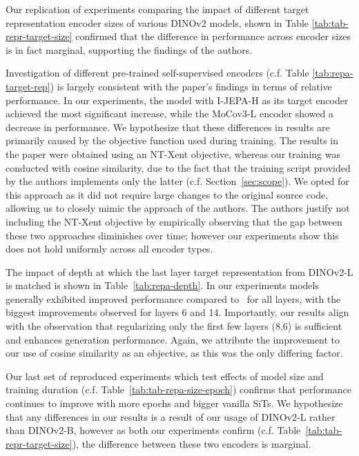 \documentclass{article}
\begin{document}
Our replication of experiments comparing the impact of different target representation encoder sizes of various DINOv2 models, shown in Table \ref{tab:tab-repr-target-size} confirmed that the difference in performance across encoder sizes is in fact marginal, supporting the findings of the authors. 

Investigation of different pre-trained self-supervised encoders (c.f. Table \ref{tab:repa-target-rep}) is largely consistent with the paper's findings in terms of relative performance. In our experiments, the model with  I-JEPA-H as its target encoder achieved the most significant increase, while the MoCov3-L encoder showed a decrease in performance. We hypothesize that these differences in results are primarily caused by the objective function used during training. The results in the paper were obtained using an NT-Xent objective, whereas our training was conducted with cosine similarity, due to the fact that the training script provided by the authors implements only the latter (c.f. Section~\ref{sec:scope}). We opted for this approach as it did not require large changes to the original source code, allowing us to closely mimic the approach of the authors. The authors justify not including the NT-Xent objective by  empirically observing that the gap between these two approaches diminishes over time; however our experiments show this does not hold uniformly across all encoder types.

The impact of depth at which the last layer target representation from DINOv2-L is matched is shown in Table~\ref{tab:repa-depth}. In our experiments models generally exhibited improved  performance compared to~\cite{yu2025repa} for all layers, with the biggest improvements observed for layers 6 and 14. Importantly, our results align with the observation that regularizing only the first few layers (8,6) is sufficient and enhances generation performance. Again, we attribute the improvement to our use of cosine similarity as an objective, as this was the only differing factor.

Our last set of reproduced experiments which test effects of model size and training duration (c.f. Table~\ref{tab:tab-repa-size-epoch}) confirms that performance continues to improve with more epochs and bigger vanilla SiTs. We hypothesize that any differences in our results is a result of our usage of DINOv2-L rather than DINOv2-B, however as both our experiments confirm (c.f. Table~\ref{tab:tab-repr-target-size}), the difference between these two encoders is marginal.
\end{document}
